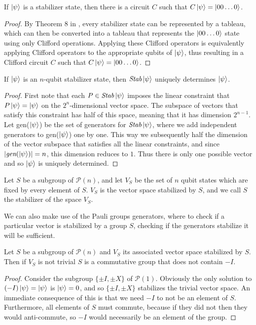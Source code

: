 \documentclass[12pt]{dalthesis}
\begin{document}
\begin{theorem}
If $\ket{\psi}$ is a stabilizer state, then there is a circuit $C$ such that $C\ket{\psi} = \ket{00 \dots 0}$.
\end{theorem}
\begin{proof}
By Theorem 8 in \cite{}, every stabilizer state can be represented by a tableau, which can then be converted into a tableau that represents the $\ket{00 \dots 0}$ state using only Clifford operations. Applying these Clifford operators is equivalently applying Clifford operators to the appropriate qubits of $\ket{\psi}$, thus resulting in a Clifford circuit $C$ such that $C\ket{\psi} = \ket{00 \dots 0}$. 
\end{proof}

\begin{theorem}
If $\ket{\psi}$ is an $n$-qubit stabilizer state, then $\textit{Stab}\ket{\psi}$ uniquely determines $\ket{\psi}$.
\end{theorem}
\begin{proof}
First note that each $P \in \textit{Stab}\ket{\psi}$ imposes the linear constraint that $P\ket{\psi} = \ket{\psi}$ on the $2^n$-dimensional vector space. The subspace of vectors that satisfy this constraint has half of this space, meaning that it has dimension $2^{n-1}$. Let gen($\ket{\psi}$) be the set of generators for $\textit{Stab}\ket{\psi}$, where we add independent generators to gen($\ket{\psi}$) one by one. This way we subsequently half the dimension of the vector subspace that satisfies all the linear constraints, and since $|\textit{gen}(\ket{\psi})| = n$, this dimension reduces to $1$. Thus there is only one possible vector and so $\ket{\psi}$ is uniquely determined.
\end{proof}

\begin{definition}
Let $S$ be a subgroup of $\mathcal{P}(n)$, and let $V_S$ be the set of $n$ qubit states which are fixed by every element of $S$. $V_S$ is the vector space stabilized by $S$, and we call $S$ the stabilizer of the space $V_S$. 
\end{definition}

We can also make use of the Pauli groups generators, where to check if a particular vector is stabilized by a group $S$, checking if the generators stabilize it will be sufficient.


\begin{proposition}
Let $S$ be a subgroup of $\mathcal{P}(n)$ and $V_S$ its associated vector space stabilized by $S$. Then if $V_S$ is not trivial $S$ is a commutative group that does not contain $-I$.
\end{proposition}
\begin{proof}
Consider the subgroup $\{\pm I, \pm X \}$ of $\mathcal{P}(1)$. Obviously the only solution to $(-I)\ket{\psi} = \ket{\psi}$ is $\ket{\psi} = 0$, and so $\{\pm I, \pm X \}$ stabilizes the trivial vector space. An immediate consequence of this is that we need $-I$ to not be an element of $S$. Furthermore, all elements of $S$ must commute, because if they did not then they would anti-commute, so $-I$ would necessarily be an element of the group.
\end{proof}
\end{document}

